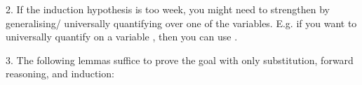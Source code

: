 \begin{isabellebody}
\begin{isamarkuptext}
  2. If the induction hypothesis is too week, you might need to strengthen by generalising/
     universally quantifying over one of the variables. E.g. if you want to universally quantify on
     a variable , then you can use .

  3. The following lemmas suffice to prove the goal with only substitution, forward reasoning, and
     induction:



\end{isamarkuptext}
\end{isabellebody}

